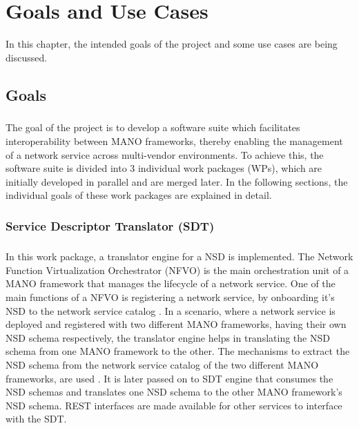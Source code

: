 \chapter{Goals and Use Cases}
\label{ch:Goals and Use Cases}

In this chapter, the intended goals of the project and some use cases are being discussed.

\section{Goals}

\paragraph{}
The goal of the project is to develop a software suite which facilitates interoperability between MANO frameworks, thereby enabling the management of a network service across multi-vendor environments. To achieve this, the software suite is divided into 3 individual work packages (WPs), which are initially developed in parallel and are merged later. In the following sections, the individual goals of these work packages are explained in detail.

\subsection{Service Descriptor Translator (SDT)}
\paragraph{}

In this work package, a translator engine for a NSD is implemented. The Network Function Virtualization Orchestrator (NFVO) is the main orchestration unit of a MANO framework that manages the lifecycle of a network service. One of the main functions of a NFVO is registering a network service, by onboarding it's NSD to the network service catalog . In a scenario, where a network service is deployed and registered with two different MANO
frameworks, having their own NSD schema respectively, the translator engine helps in translating the NSD schema from one MANO framework to the other.
The mechanisms to extract the NSD schema from the network service catalog of the two different MANO frameworks, are used . It is later passed on to SDT engine that consumes the NSD schemas and translates one NSD schema to the other MANO framework's NSD schema. REST interfaces are made available for other services to interface with the SDT.


